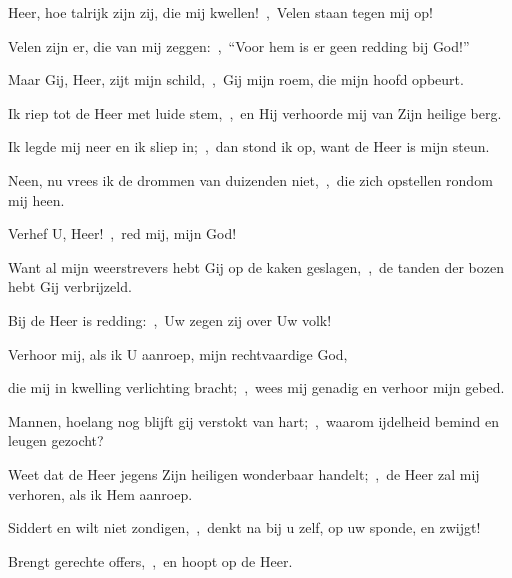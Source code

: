 \documentclass[12pt,twoside,a5paper]{article}
\begin{document}
\begin{halfparskip}
  Heer, hoe talrijk zijn zij, die mij kwellen!~\sep\ Velen staan tegen mij op!


  Velen zijn er, die van mij zeggen:~\sep\ ``Voor hem is er geen redding bij God!''

  Maar Gij, Heer, zijt mijn schild,~\sep\ Gij mijn roem, die mijn hoofd opbeurt.
\end{halfparskip}


\begin{halfparskip}
  Ik riep tot de Heer met luide stem,~\sep\ en Hij verhoorde mij van Zijn heilige berg.

  Ik legde mij neer en ik sliep in;~\sep\ dan stond ik op, want de Heer is mijn steun.

  Neen, nu vrees ik de drommen van duizenden niet,~\sep\ die zich opstellen rondom mij heen.

  Verhef U, Heer!~\sep\ red mij, mijn God!

  Want al mijn weerstrevers hebt Gij op de kaken geslagen,~\sep\ de tanden der bozen hebt Gij verbrijzeld.

Bij de Heer is redding:~\sep\ Uw zegen zij over Uw volk!
\end{halfparskip}


\begin{halfparskip}
  Verhoor mij, als ik U aanroep, mijn rechtvaardige God,


  die mij in kwelling verlichting bracht;~\sep\ wees mij genadig en verhoor mijn gebed.
\end{halfparskip}


\begin{halfparskip}
  Mannen, hoelang nog blijft gij verstokt van hart;~\sep\ waarom ijdelheid bemind en leugen gezocht?

  Weet dat de Heer jegens Zijn heiligen wonderbaar handelt;~\sep\ de Heer zal mij verhoren, als ik Hem aanroep.

  Siddert en wilt niet zondigen,~\sep\ denkt na bij u zelf, op uw sponde, en zwijgt!

  Brengt gerechte offers,~\sep\ en hoopt op de Heer.
\end{halfparskip}
\end{document}
